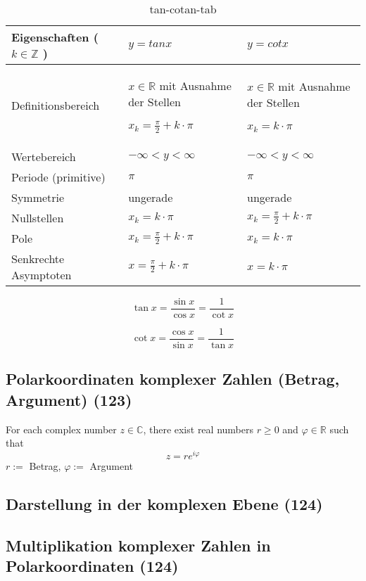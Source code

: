 \begin{table}[H]
\begin{tabular}{|l|l|l|}
\hline
Eigenschaften    ( $k \in \mathbb { Z }$ )     & $y= tan x$ & $y= cot x$ \\ \hline \hline
Definitionsbereich    &    \parbox[t]{2in}{ $x \in \mathbb { R }$ mit Ausnahme der Stellen \par  $x _ { k } = \frac { \pi } { 2} + k \cdot \pi$   }  &   \parbox[t]{2in}{   $x \in \mathbb { R }$ mit Ausnahme der Stellen  \par  $x _ { k } =  k \cdot \pi$   }    \\ 
Wertebereich          &   $- \infty < y < \infty$       &  $- \infty < y < \infty$          \\ 
Periode (primitive)   &   $\pi$       &      $\pi$     \\ 
Symmetrie             &    ungerade      &  ungerade         \\ 
Nullstellen           &     $x _ { k } = k \cdot \pi$     &      $x _ { k } = \frac { \pi } { 2} + k \cdot \pi$     \\ 
Pole                  &    $x _ { k } = \frac { \pi } { 2} + k \cdot \pi$      &    $x _ { k } = k \cdot \pi$       \\ 
Senkrechte Asymptoten &    $x = \frac { \pi } { 2} + k \cdot \pi$      &      $x = k \cdot \pi$        \\ \hline
\end{tabular}
\caption{tan-cotan-tab}
\label{tan-cotan-tab}
\end{table}

\begin{leftbar}
\noindent\begin{minipage}{.5\linewidth}
\begin{equation}
\tan x = \frac { \sin x } { \cos x } = \frac { 1} { \cot x }
\end{equation}
\end{minipage}
\begin{minipage}{.5\linewidth}
\begin{equation}
\cot x = \frac { \cos x } { \sin x } = \frac { 1} { \tan x }
\end{equation}
\end{minipage}
\end{leftbar}

\subsection{Polarkoordinaten komplexer Zahlen (Betrag, Argument) (123)}
For each complex number $z \in \mathbb { C }$, there exist real numbers $r\geq 0$ and $\varphi \in \mathbb { R }$ such that
\begin{equation}
z = r e ^ { i \varphi }
\end{equation}
$r :=$ Betrag, $\varphi :=$ Argument


\subsection{Darstellung in der komplexen Ebene (124)}

\subsection{Multiplikation komplexer Zahlen in Polarkoordinaten (124)}
